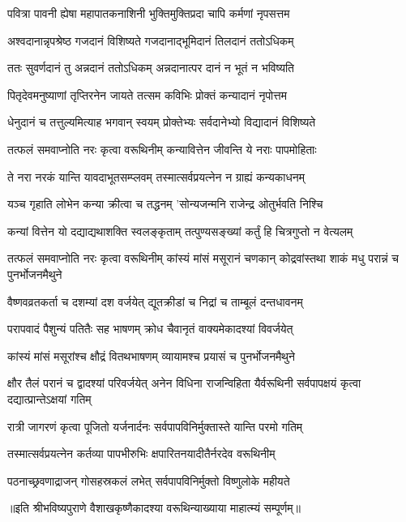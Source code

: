 \twolineshloka
{पवित्रा पावनी ह्येषा महापातकनाशिनी}
{भुक्तिमुक्तिप्रदा चापि कर्मणां नृपसत्तम} %

\twolineshloka
{अश्वदानान्नृपश्रेष्ठ गजदानं विशिष्यते}
{गजदानाद्भूमिदानं तिलदानं ततोऽधिकम्} %

\twolineshloka
{ततः सुवर्णदानं तु अन्नदानं ततोऽधिकम्}
{अन्नदानात्पर दानं न भूतं न भविष्यति} %

\twolineshloka
{पितृदेवमनुष्याणां तृप्तिरनेन जायते}
{तत्सम कविभिः प्रोक्तं कन्यादानं नृपोत्तम} %

\twolineshloka
{धेनुदानं च तत्तुल्यमित्याह भगवान् स्वयम्}
{प्रोक्तेभ्यः सर्वदानेभ्यो विद्यादानं विशिष्यते} %

\twolineshloka
{तत्फलं समवाप्नोति नरः कृत्वा वरूथिनीम्}
{कन्यावित्तेन जीवन्ति ये नराः पापमोहिताः} %

\twolineshloka
{ते नरा नरकं यान्ति यावदाभूतसम्प्लवम्}
{तस्मात्सर्वप्रयत्नेन न ग्राह्यं कन्यकाधनम्} %

\twolineshloka
{यञ्च गृहाति लोभेन कन्या क्रीत्वा च तद्धनम्}
{'सोन्यजन्मनि राजेन्द्र ओतुर्भवति निश्चि} %

\twolineshloka
{कन्यां वित्तेन यो दद्याद्यथाशक्ति स्वलङ्कृताम्}
{तत्पुण्यसङ्ख्यां कर्तुं हि चित्रगुप्तो न वेत्यलम्} %


\threelineshloka
{तत्फलं समवाप्नोति नरः कृत्वा वरूथिनीम्}
{कांस्यं मांसं मसूरानं चणकान् कोद्रवांस्तथा}
{शाकं मधु परान्नं च पुनर्भोजनमैथुने} %

\twolineshloka
{वैष्णवव्रतकर्ता च दशम्यां दश वर्जयेत्}
{द्यूतक्रीडां च निद्रां च ताम्बूलं दन्तधावनम्} %

\twolineshloka
{परापवादं पैशुन्यं पतितैः सह भाषणम्}
{क्रोध चैवानृतं वाक्यमेकादश्यां विवर्जयेत्} %

\twolineshloka
{कांस्यं मांसं मसूरांश्च क्षौद्रं वितथभाषणम्}
{व्यायामश्च प्रयासं च पुनर्भोजनमैथुने} %


\threelineshloka
{क्षौर तैलं परानं च द्वादश्यां परिवर्जयेत्}
{अनेन विधिना राजन्विहिता यैर्वरूथिनी}
{सर्वपापक्षयं कृत्वा दद्यात्प्रान्तेऽक्षयां गतिम्} %

\twolineshloka
{रात्री जागरणं कृत्वा पूजितो यर्जनार्दनः}
{सर्वपापविनिर्मुक्तास्ते यान्ति परमो गतिम्} %

\twolineshloka
{तस्मात्सर्वप्रयत्नेन कर्तव्या पापभीरुभिः}
{क्षपारितनयादीतैर्नरदेव वरूथिनीम्} %

\twolineshloka
{पठनाच्छ्रवणाद्राजन् गोसहस्रकलं लभेत्}
{सर्वपापविनिर्मुक्तो विष्णुलोके महीयते} %

॥इति श्रीभविष्यपुराणे वैशाखकृष्णैकादश्या वरूथिन्याख्याया माहात्म्यं सम्पूर्णम्॥


